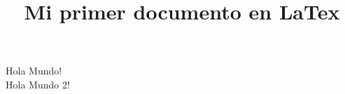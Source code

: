 \documentclass{article}
\title{Mi primer documento en LaTex} %
\begin{document}
\maketitle %
Hola Mundo! \\ %
Hola Mundo 2!
\end{document}
